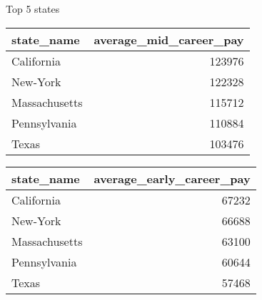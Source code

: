 \documentclass[
  ignorenonframetext,
]{beamer}
\begin{document}
\begin{frame}{Top 5 states}
\protect\hypertarget{top-5-states}{}

\begin{tabular}{l|r}
\hline
state\_name & average\_mid\_career\_pay\\
\hline
California & 123976\\
\hline
New-York & 122328\\
\hline
Massachusetts & 115712\\
\hline
Pennsylvania & 110884\\
\hline
Texas & 103476\\
\hline
\end{tabular}

\begin{tabular}{l|r}
\hline
state\_name & average\_early\_career\_pay\\
\hline
California & 67232\\
\hline
New-York & 66688\\
\hline
Massachusetts & 63100\\
\hline
Pennsylvania & 60644\\
\hline
Texas & 57468\\
\hline
\end{tabular}

\end{frame}
\end{document}
